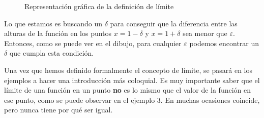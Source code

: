 \documentclass[sans]{apuntes}
\begin{document}
\begin{figure}[ht]
	\centering
	\caption{Representación gráfica de la definición de límite}
	\label{fig:limit-definition}
\end{figure}

Lo que estamos es buscando un $\delta$ para conseguir que la diferencia entre las alturas de la función en los puntos $x = 1- \delta$ y $x = 1 + \delta$ sea menor que $\varepsilon$. Entonces, como se puede ver en el dibujo, para cualquier $\varepsilon$ podemos encontrar un $\delta$ que cumpla esta condición.
\par Una vez que hemos definido formalmente el concepto de límite, se pasará en los ejemplos a hacer una introducción más coloquial. Es muy importante saber que el límite de una función en un punto \textbf{no} es lo mismo que el valor de la función en ese punto, como se puede observar en el ejemplo 3. En muchas ocasiones coincide, pero nunca tiene por qué ser igual.
\end{document}
